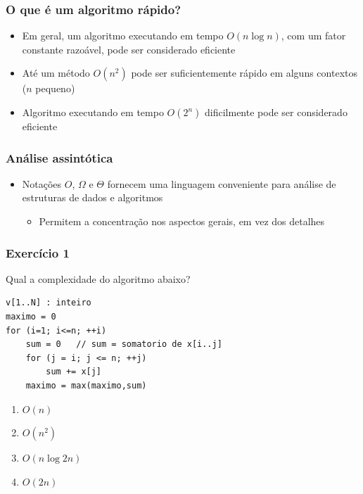 \documentclass[aspectratio=169]{beamer}
\begin{document}
\begin{frame}\frametitle{O que é um algoritmo rápido?}
\begin{itemize}
	\item Em geral, um algoritmo executando em tempo $O(n\log{n})$, com um fator constante razoável, pode ser considerado eficiente
	\item Até um método $O(n^2)$ pode ser suficientemente rápido em alguns contextos ($n$ pequeno)
	\item Algoritmo executando em tempo $O(2^n)$ dificilmente pode ser considerado eficiente
\end{itemize}
\end{frame}

\begin{frame}\frametitle{Análise assintótica}
\begin{itemize}
	\item Notações $O$, $\Omega$ e $\Theta$ fornecem uma linguagem conveniente para análise de estruturas de dados e algoritmos
	\begin{itemize}
		\item Permitem a concentração nos aspectos gerais, em vez dos detalhes
	\end{itemize}
\end{itemize}
\end{frame}

\begin{frame}[fragile]\frametitle{Exercício 1} %
Qual a complexidade do algoritmo abaixo?
{\scriptsize
\begin{verbatim}
v[1..N] : inteiro
maximo = 0
for (i=1; i<=n; ++i)
    sum = 0   // sum = somatorio de x[i..j]
    for (j = i; j <= n; ++j)
        sum += x[j]
    maximo = max(maximo,sum)
\end{verbatim}
}
\begin{enumerate}[A]
	\item $O(n)$
	\item $O(n^2)$ %
	\item $O(n \log 2n)$
	\item $O(2n)$
\end{enumerate}
\end{frame}
\end{document}
